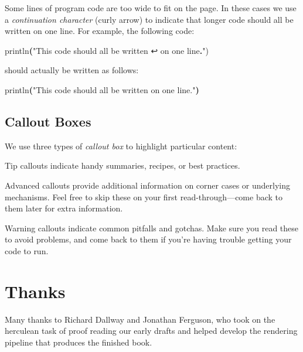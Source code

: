 \documentclass[11pt,a5paper,]{book}
\newenvironment{Shaded}{\begin{snugshade}}{\end{snugshade}}
\newcommand{\FunctionTok}[1]{\textcolor[rgb]{0.00,0.00,0.00}{#1}}
\newcommand{\NormalTok}[1]{#1}
\newcommand{\OperatorTok}[1]{\textcolor[rgb]{0.81,0.36,0.00}{\textbf{#1}}}
\newcommand{\StringTok}[1]{\textcolor[rgb]{0.31,0.60,0.02}{#1}}
\begin{document}
Some lines of program code are too wide to fit on the page. In these
cases we use a \emph{continuation character} (curly arrow) to indicate
that longer code should all be written on one line. For example, the
following code:

\begin{Shaded}
\begin{Highlighting}[]
\FunctionTok{println}\OperatorTok{(}\StringTok{"This code should all be written ↩}
\NormalTok{  on one line}\OperatorTok{.}\StringTok{")}
\end{Highlighting}
\end{Shaded}

should actually be written as follows:

\begin{Shaded}
\begin{Highlighting}[]
\FunctionTok{println}\OperatorTok{(}\StringTok{"This code should all be written on one line."}\OperatorTok{)}
\end{Highlighting}
\end{Shaded}

\hypertarget{callout-boxes}{%
\subsection*{Callout Boxes}\label{callout-boxes}}

We use three types of \emph{callout box} to highlight particular
content:

Tip callouts indicate handy summaries, recipes, or best practices.

Advanced callouts provide additional information on corner cases or
underlying mechanisms. Feel free to skip these on your first
read-through---come back to them later for extra information.

Warning callouts indicate common pitfalls and gotchas. Make sure you
read these to avoid problems, and come back to them if you're having
trouble getting your code to run.

\hypertarget{thanks}{%
\section*{Thanks}\label{thanks}}

Many thanks to Richard Dallway and Jonathan Ferguson, who took on the
herculean task of proof reading our early drafts and helped develop the
rendering pipeline that produces the finished book.
\end{document}
